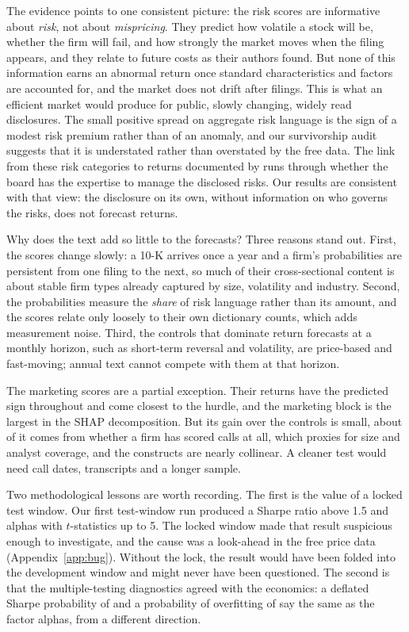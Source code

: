 \documentclass[11pt,a4paper]{article}
\begin{document}
The evidence points to one consistent picture: the risk scores are informative about \emph{risk}, not about
\emph{mispricing}. They predict how volatile a stock will be, whether the firm will fail, and how strongly the market moves
when the filing appears, and they relate to future costs as their authors found. But none of this information earns an
abnormal return once standard characteristics and factors are accounted for, and the market does not drift after filings.
This is what an efficient market would produce for public, slowly changing, widely read disclosures. The small positive
spread on aggregate risk language is the sign of a modest risk premium rather than of an anomaly, and our survivorship
audit suggests that it is understated rather than overstated by the free data. The link from these risk categories to
returns documented by \citet{schnatterly2021} runs through whether the board has the expertise to manage the disclosed
risks. Our results are consistent with that view: the disclosure on its own, without information on who governs the
risks, does not forecast returns.

Why does the text add so little to the forecasts? Three reasons stand out. First, the scores change slowly: a 10-K arrives
once a year and a firm's probabilities are persistent from one filing to the next, so much of their cross-sectional
content is about stable firm types already captured by size, volatility and industry. Second, the probabilities measure the
\emph{share} of risk language rather than its amount, and the scores relate only loosely to their own dictionary counts,
which adds measurement noise. Third, the controls that dominate return forecasts at a monthly horizon, such as short-term
reversal and volatility, are price-based and fast-moving; annual text cannot compete with them at that horizon.

The marketing scores are a partial exception. Their returns have the predicted sign throughout and come closest to the
hurdle, and the marketing block is the largest in the SHAP decomposition. But its gain over the controls is small, about
\DiagFlagShare{} of it comes from whether a firm has scored calls at all, which proxies for size and analyst coverage, and
the constructs are nearly collinear. A cleaner test would need call dates, transcripts and a longer sample.

Two methodological lessons are worth recording. The first is the value of a locked test window. Our first test-window run
produced a Sharpe ratio above 1.5 and alphas with $t$-statistics up to 5. The locked window made that result suspicious
enough to investigate, and the cause was a look-ahead in the free price data (Appendix~\ref{app:bug}). Without the lock, the
result would have been folded into the development window and might never have been questioned. The second is that the
multiple-testing diagnostics agreed with the economics: a deflated Sharpe probability of \DSR{} and a probability of
overfitting of \PBO{} say the same as the factor alphas, from a different direction.
\end{document}
